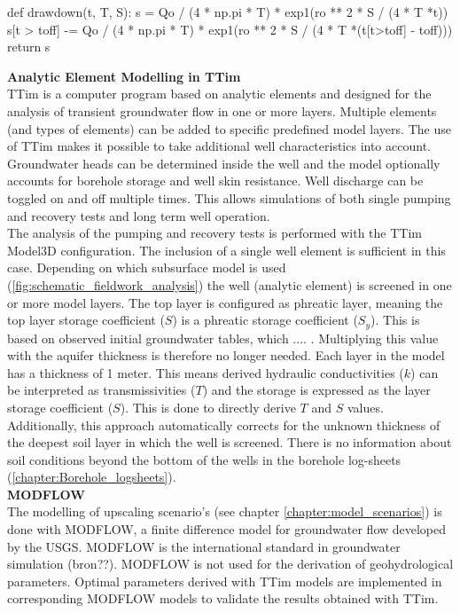 \begin{python}[h!]
def drawdown(t, T, S):
    s = Qo / (4 * np.pi * T) * exp1(ro ** 2 * S / (4 * T *t))
    s[t > toff] -= Qo / (4 * np.pi * T) * exp1(ro ** 2 * S / (4 * T *(t[t>toff] - toff)))   
    return s
\end{python}

\textbf{Analytic Element Modelling in TTim}\\
TTim is a computer program based on analytic elements and designed for the analysis of transient groundwater flow in one or more layers. Multiple elements (and types of elements) can be added to specific predefined model layers. The use of TTim makes it possible to take additional well characteristics into account. Groundwater heads can be determined inside the well and the model optionally accounts for borehole storage and well skin resistance. Well discharge can be toggled on and off multiple times. This allows simulations of both  single pumping and recovery tests and long term well operation. \\

The analysis of the pumping and recovery tests is performed with the TTim Model3D configuration. The inclusion of a single well element is sufficient in this case. Depending on which subsurface model is used (\ref{fig:schematic_fieldwork_analysis}) the well (analytic element) is screened in one or more model layers. The top layer is configured as phreatic layer, meaning the top layer storage coefficient ($S$) is a phreatic storage coefficient ($S_y$). This is based on observed initial groundwater tables, which .... . Multiplying this value with the aquifer thickness is therefore no longer needed. Each layer in the model has a thickness of 1 meter. This means derived hydraulic conductivities ($k$) can be interpreted as transmissivities ($T$) and the storage is expressed as the layer storage coefficient ($S$). This is done to directly derive $T$ and $S$ values. Additionally, this approach automatically corrects for the unknown thickness of the deepest soil layer in which the well is screened. There is no information about soil conditions beyond the bottom of the wells in the borehole log-sheets (\ref{chapter:Borehole_logsheets}). \\

\textbf{MODFLOW}\\
The modelling of upscaling scenario's (see chapter \ref{chapter:model_scenarios}) is done with MODFLOW, a finite difference model for groundwater flow developed by the USGS. MODFLOW is the international standard in groundwater simulation (bron??). MODFLOW is not used for the derivation of geohydrological parameters. Optimal parameters derived with TTim models are implemented in corresponding MODFLOW models to validate the results obtained with TTim.

